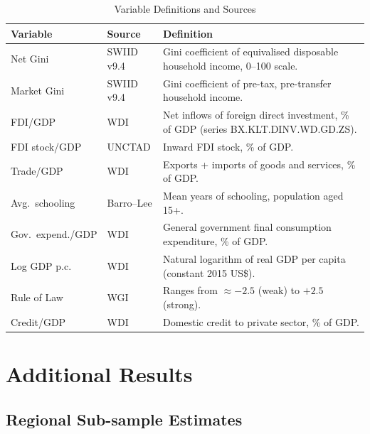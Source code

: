 \documentclass[12pt,a4paper]{article}
\begin{document}
\begin{appendices}
\begin{table}[H]
\centering
\small
\caption{Variable Definitions and Sources}
\begin{tabularx}{\textwidth}{@{} l l X @{}}
\toprule
Variable & Source & Definition \\
\midrule
Net Gini & SWIID v9.4 & Gini coefficient of equivalised disposable household income, 0--100 scale. \\
Market Gini & SWIID v9.4 & Gini coefficient of pre-tax, pre-transfer household income. \\
FDI/GDP & WDI & Net inflows of foreign direct investment, \% of GDP (series BX.KLT.DINV.WD.GD.ZS). \\
FDI stock/GDP & UNCTAD & Inward FDI stock, \% of GDP. \\
Trade/GDP & WDI & Exports + imports of goods and services, \% of GDP. \\
Avg.\ schooling & Barro--Lee & Mean years of schooling, population aged 15+. \\
Gov.\ expend./GDP & WDI & General government final consumption expenditure, \% of GDP. \\
Log GDP p.c. & WDI & Natural logarithm of real GDP per capita (constant 2015 US\$). \\
Rule of Law & WGI & Ranges from $\approx -2.5$ (weak) to $+2.5$ (strong). \\
Credit/GDP & WDI & Domestic credit to private sector, \% of GDP. \\
\bottomrule
\end{tabularx}
\end{table}

\section{Additional Results}\label{app:additional}

\subsection{Regional Sub-sample Estimates}


\end{appendices}
\end{document}
